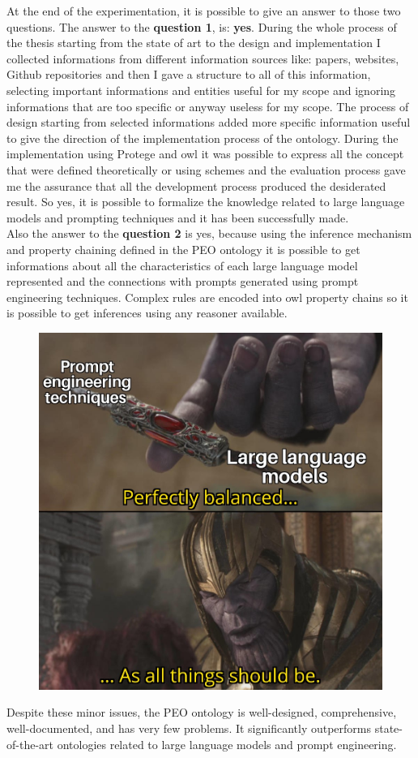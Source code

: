 At the end of the experimentation, it is possible to give an answer to those two questions. The answer to the \textbf{question 1}, is: \textbf{yes}. During the whole process of the thesis starting from the state of art to the design and implementation I collected informations from different information sources like: papers, websites, Github repositories and then I gave a structure to all of this information, selecting important informations and entities useful for my scope and ignoring informations that are too specific or anyway useless for my scope. The process of design starting from selected informations added more specific information useful to give the direction of the implementation process of the ontology. During the implementation using Protege and owl it was possible to express all the concept that were defined theoretically or using schemes and the evaluation process gave me the assurance that all the development process produced the desiderated result. So yes, it is possible to formalize the knowledge related to large language models and prompting techniques and it has been successfully made.\\
Also the answer to the \textbf{question 2} is yes, because using the inference mechanism and property chaining defined in the PEO ontology it is possible to get informations about all the characteristics of each large language model represented and the connections with prompts generated using prompt engineering techniques. Complex rules are encoded into owl property chains so it is possible to get inferences using any reasoner available. 

\begin{figure}[H]
    \centering
    \includegraphics[width=0.7\linewidth]{Figures/fig_83.jpg}
\end{figure}


Despite these minor issues, the PEO ontology is well-designed, comprehensive, well-documented, and has very few problems. It significantly outperforms state-of-the-art ontologies related to large language models and prompt engineering.
